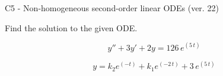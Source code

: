 \begin{exercise}
  \begin{exerciseTitle}C5 - Non-homogeneous second-order linear ODEs (ver. 22)\end{exerciseTitle}
  \begin{exerciseStatement}
    
Find the solution to the given ODE.

    
\[y''+3y'+2y = 126 \, e^{\left(5 \, t\right)}\]

  \end{exerciseStatement}
  \begin{exerciseAnswer}
    
\[y= k_{2} e^{\left(-t\right)} + k_{1} e^{\left(-2 \, t\right)} + 3 \, e^{\left(5 \, t\right)}\]

  \end{exerciseAnswer}
\end{exercise}